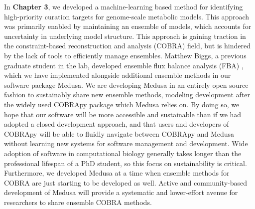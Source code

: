 \documentclass[11pt,onecolumn,notitlepage,openany,twoside]{book}
\begin{document}
\begin{refsection}
In \textbf{Chapter 3}, we developed a machine-learning based method for identifying high-priority curation targets for genome-scale metabolic models. This approach was primarily enabled by maintaining an ensemble of models, which accounts for uncertainty in underlying model structure. This approach is gaining traction in the constraint-based reconstruction and analysis (COBRA) field, but is hindered by the lack of tools to efficiently manage ensembles. Matthew Biggs, a previous graduate student in the lab, developed ensemble flux balance analysis (FBA) \cite{Biggs2017-md}, which we have implemented alongside additional ensemble methods in our software package Medusa. We are developing Medusa in an entirely open source fashion to sustainably share new ensemble methods, modeling development after the widely used COBRApy package which Medusa relies on. By doing so, we hope that our software will be more accessible and sustainable than if we had adopted a closed development approach, and that users and developers of COBRApy will be able to fluidly navigate between COBRApy and Medusa without learning new systems for software management and development. Wide adoption of software in computational biology generally takes longer than the professional lifespan of a PhD student, so this focus on sustainability is critical. Furthermore, we developed Medusa at a time when ensemble methods for COBRA are just starting to be developed as well. Active and community-based development of Medusa will provide a systematic and lower-effort avenue for researchers to share ensemble COBRA methods.


\end{refsection}
\end{document}
